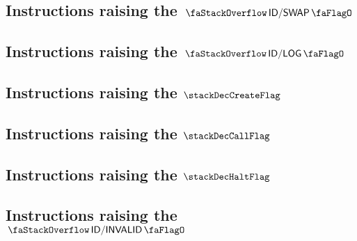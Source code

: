 \subsection{Instructions raising the $\stackDecSwapFlag$          \lispDone{}}   \label{hub: instruction handling: swap}                   
\subsection{Instructions raising the $\stackDecLogFlag$           \lispDone{}}   \label{hub: instruction handling: log}                    
\subsection{Instructions raising the $\stackDecCreateFlag$        \lispDone{}}   \label{hub: instruction handling: create}                 
\subsection{Instructions raising the $\stackDecCallFlag$          \lispDone{}}   \label{hub: instruction handling: call}                   
\subsection{Instructions raising the $\stackDecHaltFlag$          \lispDone{}}   \label{hub: instruction handling: halt}                   
\subsection{Instructions raising the $\stackDecInvalidFlag$       \lispDone{}}   \label{hub: instruction handling: invalid}                
